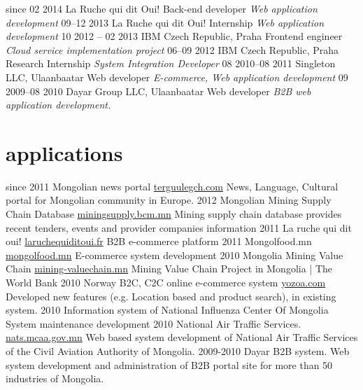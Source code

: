 \documentclass[]{friggeri-cv}
\begin{document}
\begin{entrylist}
  \entry
    {since 02 2014}
    {La Ruche qui dit Oui!}
    {Back-end developer}
    {\emph{Web application development}}
  \entry
    {09–12 2013}
    {La Ruche qui dit Oui!}
    {Internship}
    {\emph{Web application development}}
  \entry
    {10 2012 – 02 2013}
    {IBM Czech Republic, Praha}
    {Frontend engineer}
    {\emph{Cloud service implementation project}}
  \entry
    {06–09 2012}
    {IBM Czech Republic, Praha}
    {Research Internship}
    {\emph{System Integration Developer}}
  \entry
    {08 2010–08 2011}
    {Singleton LLC, Ulaanbaatar}
    {Web developer}
    {\emph{E-commerce, Web application development}}
  \entry
    {09 2009–08 2010}
    {Dayar Group LLC, Ulaanbaatar}
    {Web developer}
    {\emph{B2B web application development.}}
\end{entrylist}

\section{applications}

\begin{entrylist}
  \entry
    {since 2011}
    {Mongolian news portal}
    {\href{http://terguulegch.com}{terguulegch.com}}
    {News, Language, Cultural portal for Mongolian community in Europe.}
  \entry
    {2012}
    {Mongolian Mining Supply Chain Database}
    {\href{http://miningsupply.bcm.mn}{miningsupply.bcm.mn}}
    {Mining supply chain database provides recent tenders, events and provider companies information }
  \entry
    {2011}
    {La ruche qui dit oui!}
    {\href{http://www.laruchequiditoui.fr}{laruchequiditoui.fr}}
    {B2B e-commerce platform}
  \entry
    {2011}
    {Mongolfood.mn}
    {\href{http://mongolfood.mn/}{mongolfood.mn}}
    {E-commerce system development}
  \entry
    {2010}
    {Mongolia Mining Value Chain}
    {\href{http://mining-valuechain.eri.mn}{mining-valuechain.mn}}
    {Mining Value Chain Project in Mongolia | The World Bank}
  \entry
    {2010}
    {Norway B2C, C2C online e-commerce system}
    {\href{http://dev.yozoa.com}{yozoa.com}}
    {Developed new features (e.g. Location based and product search),  in existing system.}
  \entry
    {2010}
    {Information system of National Influenza Center Of Mongolia}
    {}
    {System maintenance development}
  \entry
    {2010}
    {National Air Traffic Services.}
    {\href{http://nats.mcaa.gov.mn/}{nats.mcaa.gov.mn}}
    {Web based system development of National Air Traffic Services of the Civil Aviation Authority of Mongolia.}
  \entry
    {2009-2010}
    {Dayar B2B system.}
    {}
    {Web system development and administration of B2B portal site for more than 50 industries of Mongolia.}
\end{entrylist}
\end{document}
